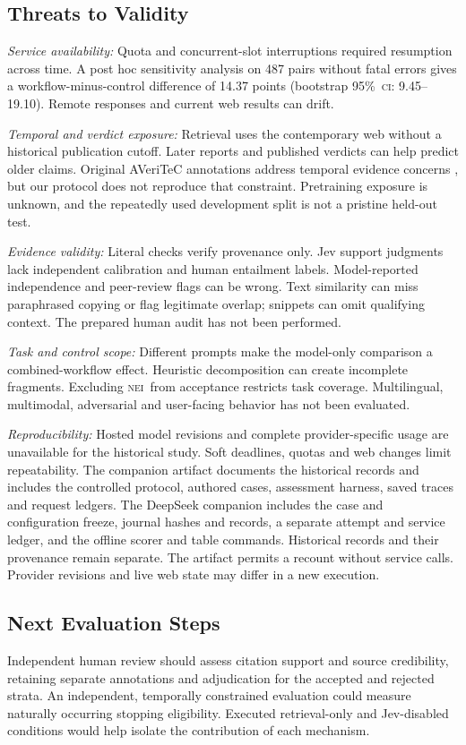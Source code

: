\documentclass[conference]{IEEEtran}
\newcommand{\NEI}{\textsc{nei}}
\newcommand{\CI}{\textsc{ci}}
\newcommand{\pct}{\%}
\begin{document}
\subsection{Threats to Validity}
\textit{Service availability:} Quota and concurrent-slot interruptions required resumption across time. A post hoc sensitivity analysis on 487 pairs without fatal errors gives a workflow-minus-control difference of 14.37 points (bootstrap 95\pct\ \CI: 9.45--19.10). Remote responses and current web results can drift.

\textit{Temporal and verdict exposure:} Retrieval uses the contemporary web without a historical publication cutoff. Later reports and published verdicts can help predict older claims. Original AVeriTeC annotations address temporal evidence concerns \cite{averitec}, but our protocol does not reproduce that constraint. Pretraining exposure is unknown, and the repeatedly used development split is not a pristine held-out test.

\textit{Evidence validity:} Literal checks verify provenance only. Jev support judgments lack independent calibration and human entailment labels. Model-reported independence and peer-review flags can be wrong. Text similarity can miss paraphrased copying or flag legitimate overlap; snippets can omit qualifying context. The prepared human audit has not been performed.

\textit{Task and control scope:} Different prompts make the model-only comparison a combined-workflow effect. Heuristic decomposition can create incomplete fragments. Excluding \NEI\ from acceptance restricts task coverage. Multilingual, multimodal, adversarial and user-facing behavior has not been evaluated.

\textit{Reproducibility:} Hosted model revisions and complete provider-specific usage are unavailable for the historical study. Soft deadlines, quotas and web changes limit repeatability. The companion artifact documents the historical records and includes the controlled protocol, authored cases, assessment harness, saved traces and request ledgers. The DeepSeek companion includes the case and configuration freeze, journal hashes and records, a separate attempt and service ledger, and the offline scorer and table commands. Historical records and their provenance remain separate. The artifact permits a recount without service calls. Provider revisions and live web state may differ in a new execution.

\subsection{Next Evaluation Steps}
Independent human review should assess citation support and source credibility, retaining separate annotations and adjudication for the accepted and rejected strata. An independent, temporally constrained evaluation could measure naturally occurring stopping eligibility. Executed retrieval-only and Jev-disabled conditions would help isolate the contribution of each mechanism.
\end{document}
